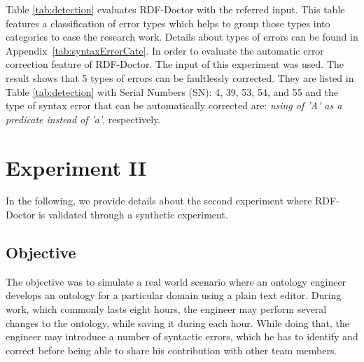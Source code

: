  Table \ref{tab:detection} evaluates RDF-Doctor with the referred input. This table features a classification of error types which helps to group those types into categories to ease the research work. Details about types of errors can be found in Appendix~\ref{tab:syntaxErrorCate}. In order to evaluate the automatic error correction feature of RDF-Doctor. The input of this experiment was used. The result shows that 5 types of errors can be faultlessly corrected. They are listed in Table \ref{tab:detection} with Serial Numbers (SN): 4, 39, 53, 54, and 55 and the type of syntax error that can be automatically corrected are: \emph{using of 'A' as a predicate instead of 'a'}, respectively.       

\section{Experiment II}

In the following, we provide details about the second experiment where RDF-Doctor is validated through a synthetic experiment. 

\subsection{Objective}
The objective was to simulate a real world scenario where an ontology engineer develops an ontology for a particular domain using a plain text editor.
During work, which commonly lasts eight hours, the engineer may perform several changes to the ontology, while saving it during each hour.
While doing that, the engineer may introduce a number of syntactic errors, which he has to identify and correct before being able to share his contribution with other team members.

